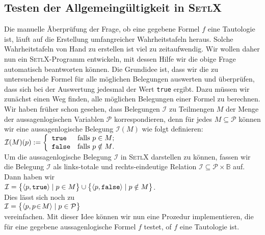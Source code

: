 \subsection{Testen der Allgemeing\"{u}ltigkeit in \textsc{SetlX}}
\noindent
 Die manuelle Ãberpr\"{u}fung der Frage, ob eine gegebene Formel $f$ eine Tautologie ist, 
l\"{a}uft auf die Erstellung umfangreicher Wahrheitstafeln heraus.   Solche Wahrheitstafeln
von Hand zu erstellen ist viel zu zeitaufwendig. 
Wir wollen daher nun ein \textsc{SetlX}-Programm entwickeln, mit dessen Hilfe wir die
obige Frage automatisch beantworten k\"{o}nnen.   Die Grundidee ist, dass wir die zu untersuchende
Formel f\"{u}r alle m\"{o}glichen Belegungen auswerten und \"{u}berpr\"{u}fen, dass sich bei der Auswertung
jedesmal der Wert \texttt{true} ergibt.  Dazu m\"{u}ssen wir zun\"{a}chst einen Weg finden, alle
m\"{o}glichen Belegungen einer Formel zu berechnen.  Wir haben fr\"{u}her schon gesehen, dass
Belegungen $\mathcal{I}$ zu Teilmengen $M$ der Menge der aussagenlogischen Variablen
$\mathcal{P}$ korrespondieren, denn f\"{u}r jedes $M \subseteq \mathcal{P}$ k\"{o}nnen wir eine
aussagenlogische Belegung $\mathcal{I}(M)$ wie folgt definieren:
\\[0.2cm]
\hspace*{1.3cm}
$\mathcal{I}(M)(p) := \left\{
\begin{array}[c]{ll}
  \mathtt{true}  & \mbox{falls $p \in M$;} \\
  \mathtt{false} & \mbox{falls $p \notin M$.}
\end{array}
\right.
$
\\[0.2cm]
Um die aussagenlogische Belegung $\mathcal{I}$ in \textsc{SetlX} darstellen zu k\"{o}nnen,
fassen wir die Belegung $\mathcal{I}$ als links-totale und rechts-eindeutige Relation
$\mathcal{I} \subseteq \mathcal{P} \times \mathbb{B}$ auf.  Dann haben wir
\\[0.2cm]
\hspace*{1.3cm}
$\mathcal{I} = \bigl\{ \pair(p, \mathtt{true} ) \mid p \in    M \bigr\} \cup 
               \bigl\{ \pair(p, \mathtt{false}) \mid p \notin M \bigr\}
$.
\\[0.2cm]
Dies l\"{a}sst sich noch zu
\\[0.2cm]
\hspace*{1.3cm}
$\mathcal{I} = \bigl\{ \langle p, p \!\in\! M\rangle \mid  p \in \mathcal{P} \bigr\}$
\\[0.2cm]
vereinfachen.  Mit dieser Idee k\"{o}nnen wir nun eine Prozedur implementieren, die f\"{u}r eine
gegebene aussagenlogische Formel $f$ testet, of $f$ eine Tautologie ist.

